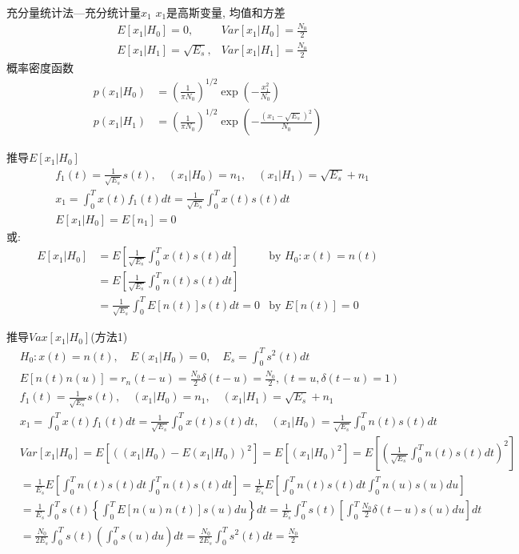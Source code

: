 \begin{frame}{充分量统计法---充分统计量$x_1$}
$x_1$是高斯变量, 均值和方差
\begin{align*}
&E[x_1|H_0]=0,&Var[x_1|H_0]=\frac{N_0}{2}\\
&E[x_1|H_1]=\sqrt{E_s},&Var[x_1|H_1]=\frac{N_0}{2}
\end{align*}
概率密度函数
\begin{align*}
p(x_1|H_0)&=\left(\frac{1}{\pi N_0}\right)^{1/2}\exp\left(-\frac{x_1^2}{N_0}\right)\\
p(x_1|H_1)&=\left(\frac{1}{\pi N_0}\right)^{1/2}\exp\left(-\frac{(x_1-\sqrt{E_s})^2}{N_0}\right)
\end{align*}
\end{frame}

\begin{frame}[shrink]{推导$E[x_1|H_0]$}
\begin{align*}
&f_1(t)=\frac{1}{\sqrt{E_s}}s(t),\quad (x_1|H_0)=n_1,\quad (x_1|H_1)=\sqrt{E_s}+n_1\\ &x_1=\int_{0}^{T}x(t)f_1(t)dt=\frac{1}{\sqrt{E_s}}\int_{0}^{T}x(t)s(t)dt\\
&E[x_1|H_0]=E[n_1]=0
\end{align*}
或:
\begin{align*}
E[x_1|H_0]&=E\left[\frac{1}{\sqrt{E_s}}\int_{0}^{T}x(t)s(t)dt\right] &\text{by }H_0: x(t)=n(t)\\
&=E\left[\frac{1}{\sqrt{E_s}}\int_{0}^{T}n(t)s(t)dt\right]&\\
&=\frac{1}{\sqrt{E_s}}\int_{0}^{T}E[n(t)]s(t)dt=0 &\text{by }E[n(t)]=0
\end{align*}
\end{frame}

\begin{frame}[shrink]{推导$Vax[x_1|H_0]$(方法1)}
\begin{align*}
&H_0:x(t)=n(t),\quad E(x_1|H_0)=0,\quad E_s=\int_{0}^{T}s^2(t)dt\\
&E[n(t)n(u)]=r_n(t-u)=\frac{N_0}{2}\delta(t-u)=\frac{N_0}{2},(t=u,\delta(t-u)=1)\\
&f_1(t)=\frac{1}{\sqrt{E_s}}s(t),\quad (x_1|H_0)=n_1,\quad (x_1|H_1)=\sqrt{E_s}+n_1\\ &x_1=\int_{0}^{T}x(t)f_1(t)dt=\frac{1}{\sqrt{E_s}}\int_{0}^{T}x(t)s(t)dt,\quad (x_1|H_0)=\frac{1}{\sqrt{E_s}}\int_{0}^{T}n(t)s(t)dt
\end{align*}
\begin{align*}
&Var[x_1|H_0]=E[((x_1|H_0)-E(x_1|H_0))^2]=E[(x_1|H_0)^2]=E\left[\left(\frac{1}{\sqrt{E_s}}\int_{0}^{T}n(t)s(t)dt\right)^2\right]\\
&=\frac{1}{E_s}E\left[\int_{0}^{T}n(t)s(t)dt\int_{0}^{T}n(t)s(t)dt\right]=\frac{1}{E_s}E\left[\int_{0}^{T}n(t)s(t)dt\int_{0}^{T}n(u)s(u)du\right]\\
&=\frac{1}{E_s}\int_{0}^{T}s(t)\left\{\int_{0}^{T}E[n(u)n(t)]s(u)du\right\}dt=\frac{1}{E_s}\int_{0}^{T}s(t)\left[\int_{0}^{T}\frac{N_0}{2}\delta(t-u)s(u)du\right]dt\\
&=\frac{N_0}{2E_s}\int_{0}^{T}s(t)\left(\int_{0}^{T}s(u)du\right)dt=\frac{N_0}{2E_s}\int_{0}^{T}s^2(t)dt=\frac{N_0}{2}
\end{align*}
\end{frame}


